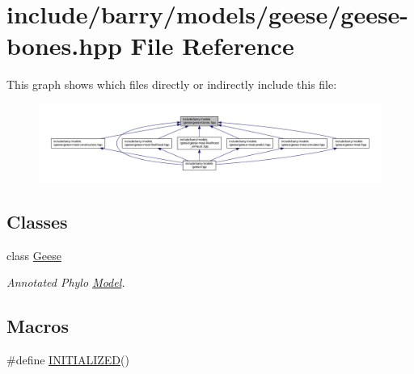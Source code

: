 \hypertarget{geese-bones_8hpp}{}\section{include/barry/models/geese/geese-\/bones.hpp File Reference}
\label{geese-bones_8hpp}
This graph shows which files directly or indirectly include this file\+:
\nopagebreak
\begin{figure}[H]
\begin{center}
\leavevmode
\includegraphics[width=350pt]{geese-bones_8hpp__dep__incl}
\end{center}
\end{figure}
\subsection*{Classes}
\begin{DoxyCompactItemize}
\item 
class \hyperlink{class_geese}{Geese}
\begin{DoxyCompactList}\small\item\em Annotated Phylo \hyperlink{class_model}{Model}. \end{DoxyCompactList}\end{DoxyCompactItemize}
\subsection*{Macros}
\begin{DoxyCompactItemize}
\item 
\#define \hyperlink{geese-bones_8hpp_a08888c91f4cab1da64c8f8bf10b59c40}{I\+N\+I\+T\+I\+A\+L\+I\+Z\+ED}()
\end{DoxyCompactItemize}
